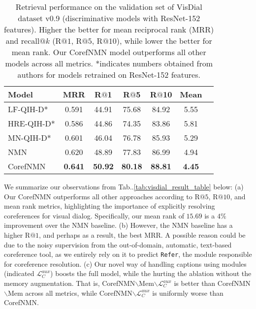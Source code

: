 \documentclass[runningheads]{llncs}
\makeatletter
\def\adl@drawiv#1#2#3{\hskip.5\tabcolsep
        \xleaders#3{#2.5\@tempdimb #1{1}#2.5\@tempdimb}#2\z@ plus1fil minus1fil\relax
        \hskip.5\tabcolsep}
\newcommand{\cdashlinelr}[1]{\noalign{\vskip\aboverulesep
           \global\let\@dashdrawstore\adl@draw
           \global\let\adl@draw\adl@drawiv}
  \cdashline{#1}
  \noalign{\global\let\adl@draw\@dashdrawstore
           \vskip\belowrulesep}}
\DeclareRobustCommand\onedot{\futurelet\@let@token\@onedot}
\def\@onedot{\ifx\@let@token.\else.\null\fi\xspace}
\def\Table{Tab\onedot}
\newcommand{\nmn}{CorefNMN\xspace}
\newcommand{\myparagraph}[1]{\vspace{0pt}\noindent{\bf #1}}
\makeatother
\begin{document}
\begin{table}[t]
	\centering
	\setlength{\tabcolsep}{6pt}
\begin{tabular}{lcccccc}
	\toprule
	\textbf{Model} & \textbf{MRR} & \textbf{R$@$1} & \textbf{R$@$5}
    				& \textbf{R$@$10} & \textbf{Mean} \\\midrule
LF-QIH-D* \cite{visdial} 
    	& 0.591 & 44.91 & 75.68 & 84.92 & 5.55\\
    HRE-QIH-D* \cite{visdial}
    	& 0.586 & 44.86 & 74.35 & 83.86 & 5.81\\
    MN-QIH-D* \cite{visdial}
    	& 0.601 & 46.04 & 76.78 & 85.93 & 5.29\\
    NMN\cite{hu2017learning}
    	& 0.620 & 48.89 & 77.83 & 86.99 & 4.94\\
	\cdashlinelr{1-6}
    \nmn
    	& \textbf{0.641} & \textbf{50.92} & \textbf{80.18} & \textbf{88.81} & \textbf{4.45}\\    
    \bottomrule
	\end{tabular}
\caption{
    Retrieval performance on the validation set of VisDial
    dataset v0.9 \cite{visdial} 
    (discriminative models with ResNet-152 \cite{he16cvpr} features).
    Higher the better for mean reciprocal rank (MRR) and recall$@k$ 
    (R$@1$, R$@5$, R$@10$), while lower the better for mean rank.
    Our \nmn model outperforms all other models across all metrics.
    *indicates numbers obtained from authors for models retrained on ResNet-152
    features.}
    \label{tab:visdial_disc_result_table_resnet}
\end{table}
% 




\myparagraph{Results.}
We summarize our observations from \Table\ref{tab:visdial_result_table} below:
(a) Our \nmn outperforms all other approaches according to R$@5$, R$@10$,
  and mean rank metrics, highlighting the importance of explicitly resolving
  coreferences for visual dialog.
  Specifically, our mean rank of $15.69$ is a $4\%$ improvement over the NMN 
  baseline.
(b) However, the NMN baseline has a higher R$@1$, and perhaps as a result,
	the best MRR.
    A possible reason could be due to the noisy supervision from the 
    out-of-domain, automatic, text-based coreference tool, as we entirely rely
    on it to predict \texttt{Refer}, the module responsible for coreference
    resolution.
(c) Our novel way of handling captions using modules (indicated
	$\mathcal{L}_C^{aux}$) boosts the full model, while the 
    hurting the ablation without the memory augmentation.
    That is, \nmn{}$\backslash$Mem$\backslash\mathcal{L}_C^{aux}$ is better 
    than \nmn{}$\backslash$Mem across all metrics, while 
    \nmn{}$\backslash \mathcal{L}_C^{aux}$ is uniformly worse than \nmn.
\end{document}
